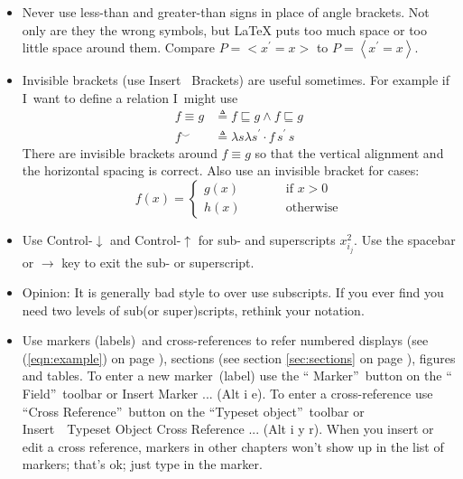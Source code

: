 \begin{itemize}
\item Never use less-than and greater-than signs in place of angle brackets.
Not only are they the wrong symbols, but LaTeX puts too much space or too
little space around them. Compare $P=<x^{\prime }=x>$ to $P=\left\langle
x^{\prime }=x\right\rangle $.

\item Invisible brackets (use Insert \TEXTsymbol{>}\TEXTsymbol{>}\ Brackets)
are useful sometimes. For example if I\ want to define a relation I\ might
use%
\begin{align*}
\left. f\equiv g\right. & \triangleq f\sqsubseteq g\wedge f\sqsubseteq g \\
f^{\smallsmile }& \triangleq \lambda s\lambda s^{\prime }\cdot f\,s^{\prime
}\,s
\end{align*}%
There are invisible brackets around $f\equiv g$ so that the vertical
alignment and the horizontal spacing is correct. Also use an invisible
bracket for cases:%
\begin{equation*}
f(x)=\left\{ 
\begin{array}{lll}
g(x) & \qquad  & \text{if }x>0 \\ 
h(x) &  & \text{otherwise}%
\end{array}%
\right. 
\end{equation*}

\item Use Control-$\downarrow $ and Control-$\uparrow $ for sub- and
superscripts $x_{i_{j}}^{2}$. Use the spacebar or $\rightarrow $ key to exit
the sub- or superscript.

\item Opinion: It is generally bad style to over use subscripts. If you ever
find you need two levels of sub(or super)scripts, rethink your notation.

\item Use markers (labels)\ and cross-references to refer numbered displays
(see (\ref{eqn:example}) on page \pageref{eqn:example}), sections (see
section \ref{sec:sections} on page \pageref{sec:sections}), figures and
tables. To enter a new marker\ (label) use the \textquotedblleft
Marker\textquotedblright\ button on the \textquotedblleft
Field\textquotedblright\ toolbar or Insert \TEXTsymbol{>}\TEXTsymbol{>}
Marker ... (Alt i e). To enter a cross-reference use \textquotedblleft Cross
Reference\textquotedblright\ button on the \textquotedblleft Typeset
object\textquotedblright\ toolbar or Insert\ \TEXTsymbol{>}\TEXTsymbol{>}\
Typeset Object \TEXTsymbol{>}\TEXTsymbol{>} Cross Reference ... (Alt i y r).
When you insert or edit a cross reference, markers in other chapters won't
show up in the list of markers; that's ok; just type in the marker.


\end{itemize}
